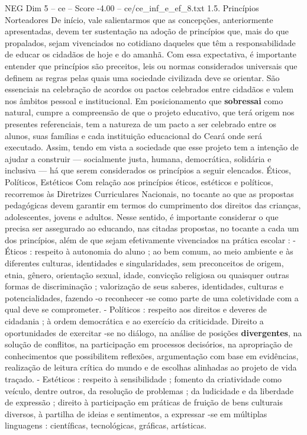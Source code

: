 \begin{textsample}{NEG Dim 5 – ce – Score -4.00 – ce/ce\_inf\_e\_ef\_8.txt}  \label{ex:f5_neg_031}
1.5.
Princípios Norteadores De início, vale salientarmos que as concepções, anteriormente apresentadas, devem ter sustentação na adoção de princípios que, mais do que propalados, sejam vivenciados no cotidiano daqueles que têm a responsabilidade de educar os cidadãos de hoje e do amanhã.
Com essa expectativa, é importante entender que princípios são preceitos, leis ou normas considerados universais que definem as regras pelas quais uma sociedade civilizada deve se orientar.
São essenciais na celebração de acordos ou pactos celebrados entre cidadãos e valem nos âmbitos pessoal e institucional.
Em posicionamento que \textbf{sobressai} como natural, cumpre a compreensão de que o projeto educativo, que terá origem nos presentes referenciais, tem a natureza de um pacto a ser celebrado entre os alunos, suas famílias e cada instituição educacional do Ceará onde será executado.
Assim, tendo em vista a sociedade que esse projeto tem a intenção de ajudar a construir — socialmente justa, humana, democrática, solidária e inclusiva — há que serem considerados os princípios a seguir elencados.
Éticos, Políticos, Estéticos Com relação aos princípios éticos, estéticos e políticos, recorremos às Diretrizes Curriculares Nacionais, no tocante ao que as propostas pedagógicas devem garantir em termos do cumprimento dos direitos das crianças, adolescentes, jovens e adultos.
Nesse sentido, é importante considerar o que precisa ser assegurado ao educando, nas citadas propostas, no tocante a cada um dos princípios, além de que sejam efetivamente vivenciados na prática escolar : - Éticos : respeito à autonomia do aluno ; ao bem comum, ao meio ambiente e às diferentes culturas, identidades e singularidades, sem preconceitos de origem, etnia, gênero, orientação sexual, idade, convicção religiosa ou quaisquer outras formas de discriminação ; valorização de seus saberes, identidades, culturas e potencialidades, fazendo -o reconhecer -se como parte de uma coletividade com a qual deve se comprometer. - Políticos : respeito aos direitos e deveres de cidadania ; à ordem democrática e ao exercício da criticidade.
Direito a oportunidades de exercitar -se no diálogo, na análise de posições \textbf{divergentes}, na solução de conflitos, na participação em processos decisórios, na apropriação de conhecimentos que possibilitem reflexões, argumentação com base em evidências, realização de leitura crítica do mundo e de escolhas alinhadas ao projeto de vida traçado. - Estéticos : respeito à sensibilidade ; fomento da criatividade como veículo, dentre outros, da resolução de problemas ; da ludicidade e da liberdade de expressão ; direito à participação em práticas de fruição de bens culturais diversos, à partilha de ideias e sentimentos, a expressar -se em múltiplas linguagens : científicas, tecnológicas, gráficas, artísticas.

\end{textsample}
